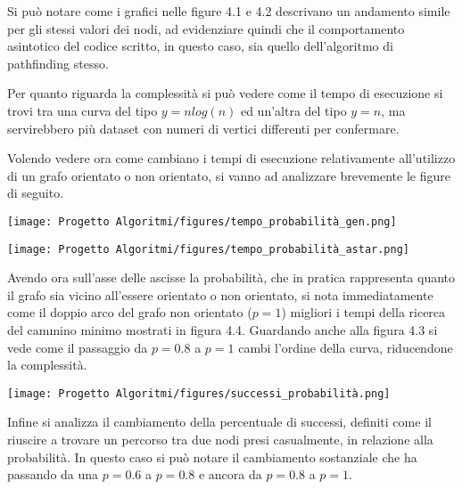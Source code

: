 \documentclass[12pt,a4paper]{report}
\begin{document}
\medskip
\medskip
\medskip

Si può notare come i grafici nelle figure 4.1 e 4.2 descrivano un andamento simile per gli stessi valori dei nodi, ad evidenziare quindi che il comportamento asintotico del codice scritto, in questo caso, sia quello dell'algoritmo di pathfinding stesso. 

Per quanto riguarda la complessità si può vedere come il tempo di esecuzione si trovi tra una curva del tipo $y=nlog(n)$ ed un'altra del tipo $y=n$, ma servirebbero più dataset con numeri di vertici differenti per confermare.

Volendo vedere ora come cambiano i tempi di esecuzione relativamente all'utilizzo di un grafo orientato o non orientato, si vanno ad analizzare brevemente le figure di seguito.

\medskip

\texttt{[image: Progetto Algoritmi/figures/tempo\_probabilità\_gen.png]}

\medskip
\medskip

\texttt{[image: Progetto Algoritmi/figures/tempo\_probabilità\_astar.png]}

Avendo ora sull'asse delle ascisse la probabilità, che in pratica rappresenta quanto il grafo sia vicino all'essere orientato o non orientato, si nota immediatamente come il doppio arco del grafo non orientato ($p=1$) migliori i tempi della ricerca del cammino minimo mostrati in figura 4.4. 
Guardando anche alla figura 4.3 si vede come il passaggio da $p=0.8$ a $p=1$ cambi l'ordine della curva, riducendone la complessità.

\medskip

\texttt{[image: Progetto Algoritmi/figures/successi\_probabilità.png]}

\medskip

Infine si analizza il cambiamento della percentuale di successi, definiti come il riuscire a trovare un percorso tra due nodi presi casualmente, in relazione alla probabilità.
In questo caso si può notare il cambiamento sostanziale che ha passando da una $p=0.6$ a $p=0.8$ e ancora da $p=0.8$ a $p=1$.
\end{document}
